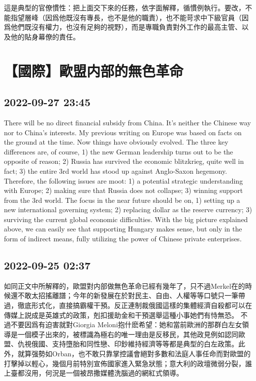 \documentclass[twocolumn]{ctexart}
\begin{document}
這是典型的官僚慣性：把上面交下來的任務，依字面解釋，循慣例執行。要改，不能指望層峰（因爲他既沒有專長，也不是他的職責），也不能苛求中下級官員（因爲他們既沒有權力，也沒有足夠的視野），而是專職負責對外工作的最高主管、以及他的貼身幕僚的責任。
\section*{【國際】歐盟内部的無色革命}
\subsection*{2022-09-27 23:45}

There will be no direct financial subsidy from China. It's neither the Chinese way nor to China's interests.
My previous writing on Europe was based on facts on the ground at the time. Now things have obviously evolved. The three key differences are, of course, 1) the new German leadership turns out to be the opposite of reason; 2) Russia has survived the economic blitzkrieg, quite well in fact; 3) the entire 3rd world has stood up against Anglo-Saxon hegemony. Therefore, the following issues are moot: 1) a potential strategic understanding with Europe; 2) making sure that Russia does not collapse; 3) winning support from the 3rd world. The focus in the near future should be on, 1) setting up a new international governing system; 2) replacing dollar as the reserve currency; 3) surviving the current global economic difficulties.
With the big picture explained above, we can easily see that supporting Hungary makes sense, but only in the form of indirect means, fully utilizing the power of Chinese private enterprises.
\subsection*{2022-09-25 02:37}

如同正文中所解釋的，歐盟對内部做無色革命已經有幾年了，只不過Merkel在的時候還不敢太招搖離譜；今年的新發展在於對民主、自由、人權等等口號只一筆帶過，徹底形式化，直接搞霸權干預。反正連制裁俄國這樣的集體經濟自殺都可以在傳媒上説成是英雄式的政策，剋扣援助金和干預選舉這種小事她們有恃無恐。
不過不要因爲有迫害就對Giorgia Meloni抱什麽希望：她和當前歐洲的那群白左女領導是一個模子出來的，被標識為極右的唯一理由是反移民，其他政見例如認同歐盟、仇視俄國、支持墮胎和同性戀、印鈔維持經濟等等都是典型的白左政策。此外，就算强勢如Orban，也不敢只靠掌控議會絕對多數和法庭人事任命而對歐盟的打擊掉以輕心，幾個月前特別宣佈國家進入緊急狀態；意大利的政壇微弱分裂，誰上臺都沒用，何況是一個被昂撒媒體洗腦過的網紅式領導。
\end{document}
